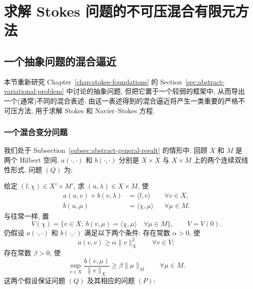 \makeatletter
\gdef\@chapapp{\chaptername}
\gdef\thechapter{\arabic{chapter}}
\gdef\theHchapter{\arabic{chapter}}
\gdef\Hy@chapapp{chapter}
\makeatother
{}
\setcounter{chapter}{2}
\chapter{求解 Stokes 问题的不可压混合有限元方法}
\label{chap:incompressible-mixed-stokes}
\renewcommand{\thesection}{\arabic{section}}
\renewcommand{\thesubsection}{\thesection.\arabic{subsection}}
\renewcommand{\theequation}{\thesection.\arabic{equation}}
\renewcommand{\thestatement}{\thesection.\arabic{statement}}

\section{一个抽象问题的混合逼近}
\label{sec:incompressible-abstract-mixed-approximation}

本节重新研究 Chapter~\ref{chap:stokes-foundations} 的
Section~\ref{sec:abstract-variational-problem} 中讨论的抽象问题,
但把它置于一个较弱的框架中, 从而导出一个(通常)不同的混合表述.
由这一表述得到的混合逼近将产生一类重要的严格不可压方法,
用于求解 Stokes 和 Navier--Stokes 方程.

\subsection{一个混合变分问题}
\label{subsec:incompressible-mixed-variational-problem}
\setcounter{equation}{0}

我们处于 Subsection~\ref{subsec:abstract-general-result} 的情形中.
回顾 $X$ 和 $M$ 是两个 Hilbert 空间,
$a(\cdot,\cdot)$ 和 $b(\cdot,\cdot)$ 分别是
$X\times X$ 与 $X\times M$ 上的两个连续双线性形式.
问题 $(Q)$ 为:

给定 $(l,\chi)\in X'\times M'$, 求 $(u,\lambda)\in X\times M$, 使
\begin{align}
a(u,v)+b(v,\lambda)&=\langle l,v\rangle
&&\forall v\in X,\label{eq:incompressible-abstract-q-first}\\
b(u,\mu)&=\langle\chi,\mu\rangle
&&\forall\mu\in M.\label{eq:incompressible-abstract-q-second}
\end{align}
与往常一样, 置
\[
V(\chi)=\{v\in X;\ b(v,\mu)=\langle\chi,\mu\rangle
\quad\forall\mu\in M\},
\qquad
V=V(0).
\]
仍假设 $a(\cdot,\cdot)$ 和 $b(\cdot,\cdot)$ 满足以下两个条件:
存在常数 $\alpha>0$, 使
\begin{equation}\label{eq:incompressible-abstract-v-ellipticity}
a(v,v)\geq\alpha\|v\|_X^2
\qquad\forall v\in V;
\end{equation}
存在常数 $\beta>0$, 使
\begin{equation}\label{eq:incompressible-abstract-inf-sup}
\sup_{v\in X}\frac{b(v,\mu)}{\|v\|_X}
\geq\beta\|\mu\|_M
\qquad\forall\mu\in M.
\end{equation}
这两个假设保证问题 $(Q)$ 及其相应的问题 $(P)$:

